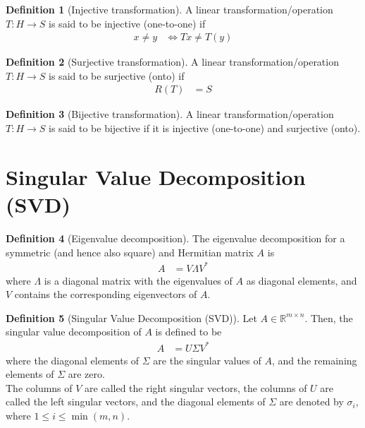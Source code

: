 \documentclass[titlepage, fleqn, a4paper, 12pt, twoside]{article}
\theoremstyle{definition}
\newtheorem{definition}{Definition}
\theoremstyle{theorem}
\begin{document}
\begin{definition}[Injective transformation]
	A linear transformation/operation $T: H \to S$ is said to be injective (one-to-one) if
	\begin{align*}
		x \neq y &\iff T x \neq T(y)
	\end{align*}
\end{definition}

\begin{definition}[Surjective transformation]
	A linear transformation/operation $T: H \to S$ is said to be surjective (onto) if
	\begin{align*}
		R(T) &= S
	\end{align*}
\end{definition}

\begin{definition}[Bijective transformation]
	A linear transformation/operation $T: H \to S$ is said to be bijective if it is injective (one-to-one) and surjective (onto).
\end{definition}

\section{Singular Value Decomposition (SVD)}

\begin{definition}[Eigenvalue decomposition]
	The eigenvalue decomposition for a symmetric (and hence also square) and Hermitian matrix $A$ is
	\begin{align*}
		A &= V \Lambda V^*
	\end{align*}
	where $\Lambda$ is a diagonal matrix with the eigenvalues of $A$ as diagonal elements, and $V$ contains the corresponding eigenvectors of $A$.
\end{definition}

\begin{definition}[Singular Value Decomposition (SVD)]
	Let $A \in \mathbb{R}^{m \times n}$.
	Then, the singular value decomposition of $A$ is defined to be
	\begin{align*}
		A &= U \Sigma V^*
	\end{align*}
	where the diagonal elements of $\Sigma$ are the singular values of $A$, and the remaining elements of $\Sigma$ are zero.\\
	The columns of $V$ are called the right singular vectors, the columns of $U$ are called the left singular vectors, and the diagonal elements of $\Sigma$ are denoted by $\sigma_i$, where $1 \le i \le \min(m,n)$.
\end{definition}
\end{document}
